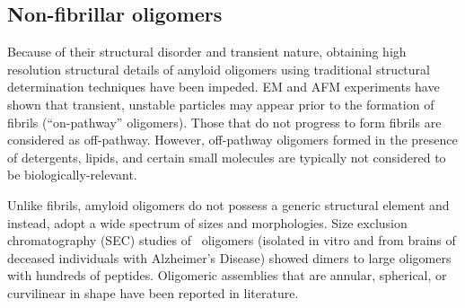 

\subsection{Non-fibrillar oligomers}

Because of their structural disorder and transient nature, obtaining high resolution structural details of amyloid oligomers using traditional structural determination techniques have been impeded. EM and AFM experiments have shown that transient, unstable particles may appear prior to the formation of fibrils (``on-pathway'' oligomers).\cite{Chromy:2003p2575,Ahmed:2010p5694,Caughey:2003jq} Those that do not progress to form fibrils are considered as off-pathway.\cite{Kayed:2003en} However, off-pathway oligomers formed in the presence of detergents, lipids, and certain small molecules are typically not considered to be biologically-relevant.\cite{Yu:2009p2873,Laurents:2005ki}

Unlike fibrils, amyloid oligomers do not possess a generic structural element and instead, adopt a wide spectrum of sizes and morphologies. Size exclusion chromatography (SEC) studies of \ oligomers (isolated in vitro and from brains of deceased individuals with Alzheimer's Disease) showed dimers to large oligomers with hundreds of peptides.\cite{Haass:2007db,Walsh:2007fu} Oligomeric assemblies that are annular, spherical, or curvilinear in shape have been reported in literature.\cite{Haass:2007db,Kim:2009p2715,Lashuel:2002eg}

